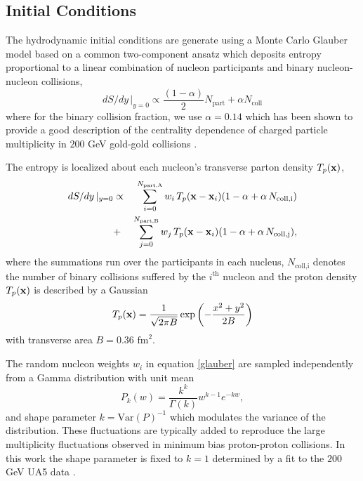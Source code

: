 \documentclass[aps,prc,reprint,amsmath,nofootinbib,superscriptaddress]{revtex4-1}
\begin{document}
\subsection{Initial Conditions}

The hydrodynamic initial conditions are generate using a Monte Carlo Glauber model based on a common two-component ansatz which deposits entropy proportional to a linear combination 
of nucleon participants and binary nucleon-nucleon collisions,
\begin{equation}
 dS/dy \,\vert_{y=0} \propto \frac{(1-\alpha)}{2}N_\text{part} + \alpha N_\text{coll}
 \label{twocomponent}
\end{equation}
where for the binary collision fraction, we use $\alpha=0.14$ which has been shown to provide a good description of the centrality dependence of charged particle 
multiplicity in $200$ GeV gold-gold collisions \cite{?}.

The entropy is localized about each nucleon's transverse parton density $T_p({\bf x})$,
\begin{eqnarray}
 dS/dy \,\vert_{y=0} &\propto& \sum\limits_{i=0}^{N_\text{part,A}} w_i\, T_p({\bf x} - {\bf x}_i)(1-\alpha + \alpha\, N_\text{coll,i}) \nonumber \\
                     &+& \sum\limits_{j=0}^{N_\text{part,B}} w_j\, T_p({\bf x} - {\bf x}_i)(1-\alpha + \alpha\, N_\text{coll,j}),
 \label{glauber}
\end{eqnarray}
where the summations run over the participants in each nucleus, $N_\text{coll,i}$ denotes the number of binary collisions suffered by the $i^\text{th}$ nucleon 
and the proton density $T_p({\bf x})$ is described by a Gaussian
\begin{equation}
 T_p({\bf x}) = \frac{1}{\sqrt{2 \pi B}} \exp \left(-\frac{x^2+y^2}{2 B} \right)
\end{equation}
with transverse area $B = 0.36$ $\text{fm}^2$.

The random nucleon weights $w_i$ in equation \eqref{glauber} are sampled independently from a Gamma distribution with unit mean
\begin{equation}
 P_k(w) = \frac{k^k}{\Gamma(k)} w^{k-1} e^{-k w},
\end{equation}
and shape parameter $k = \text{Var}(P)^{-1}$ which modulates the variance of the distribution. 
These fluctuations are typically added \cite{?} to reproduce the large multiplicity fluctuations observed in minimum bias proton-proton collisions. 
In this work the shape parameter is fixed to $k=1$ determined by a fit to the $200$ GeV UA5 data \cite{?}. 
\end{document}
